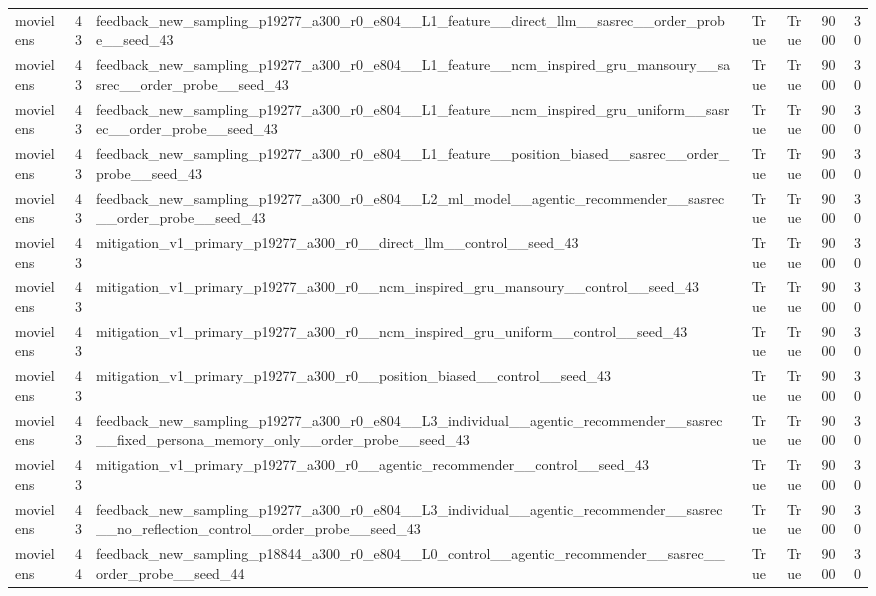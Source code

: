 \begin{table}[htbp!]
\begin{tabular}{lrlrrrr}
movielens & 43 & feedback\_new\_sampling\_p19277\_a300\_r0\_e804\_\_L1\_feature\_\_direct\_llm\_\_sasrec\_\_order\_probe\_\_seed\_43 & True & True & 9000 & 30 \\
movielens & 43 & feedback\_new\_sampling\_p19277\_a300\_r0\_e804\_\_L1\_feature\_\_ncm\_inspired\_gru\_mansoury\_\_sasrec\_\_order\_probe\_\_seed\_43 & True & True & 9000 & 30 \\
movielens & 43 & feedback\_new\_sampling\_p19277\_a300\_r0\_e804\_\_L1\_feature\_\_ncm\_inspired\_gru\_uniform\_\_sasrec\_\_order\_probe\_\_seed\_43 & True & True & 9000 & 30 \\
movielens & 43 & feedback\_new\_sampling\_p19277\_a300\_r0\_e804\_\_L1\_feature\_\_position\_biased\_\_sasrec\_\_order\_probe\_\_seed\_43 & True & True & 9000 & 30 \\
movielens & 43 & feedback\_new\_sampling\_p19277\_a300\_r0\_e804\_\_L2\_ml\_model\_\_agentic\_recommender\_\_sasrec\_\_order\_probe\_\_seed\_43 & True & True & 9000 & 30 \\
movielens & 43 & mitigation\_v1\_primary\_p19277\_a300\_r0\_\_direct\_llm\_\_control\_\_seed\_43 & True & True & 9000 & 30 \\
movielens & 43 & mitigation\_v1\_primary\_p19277\_a300\_r0\_\_ncm\_inspired\_gru\_mansoury\_\_control\_\_seed\_43 & True & True & 9000 & 30 \\
movielens & 43 & mitigation\_v1\_primary\_p19277\_a300\_r0\_\_ncm\_inspired\_gru\_uniform\_\_control\_\_seed\_43 & True & True & 9000 & 30 \\
movielens & 43 & mitigation\_v1\_primary\_p19277\_a300\_r0\_\_position\_biased\_\_control\_\_seed\_43 & True & True & 9000 & 30 \\
movielens & 43 & feedback\_new\_sampling\_p19277\_a300\_r0\_e804\_\_L3\_individual\_\_agentic\_recommender\_\_sasrec\_\_fixed\_persona\_memory\_only\_\_order\_probe\_\_seed\_43 & True & True & 9000 & 30 \\
movielens & 43 & mitigation\_v1\_primary\_p19277\_a300\_r0\_\_agentic\_recommender\_\_control\_\_seed\_43 & True & True & 9000 & 30 \\
movielens & 43 & feedback\_new\_sampling\_p19277\_a300\_r0\_e804\_\_L3\_individual\_\_agentic\_recommender\_\_sasrec\_\_no\_reflection\_control\_\_order\_probe\_\_seed\_43 & True & True & 9000 & 30 \\
movielens & 44 & feedback\_new\_sampling\_p18844\_a300\_r0\_e804\_\_L0\_control\_\_agentic\_recommender\_\_sasrec\_\_order\_probe\_\_seed\_44 & True & True & 9000 & 30 \\

\end{tabular}
\end{table}

